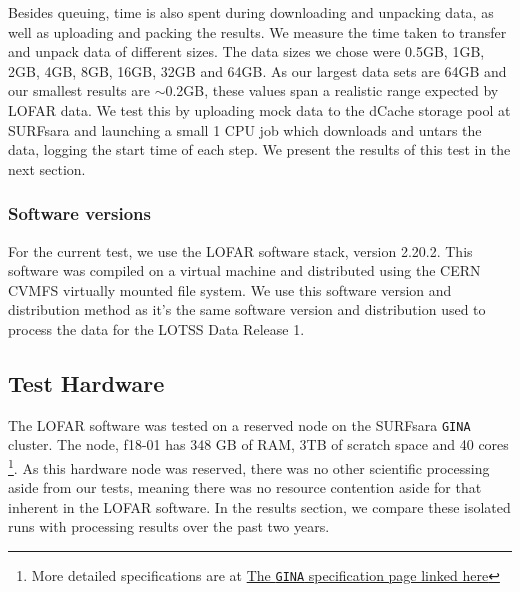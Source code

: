 Besides queuing, time is also spent during downloading and unpacking data, as well as uploading and packing the results. We measure the time taken to transfer and unpack data of different sizes. The data sizes we chose were 0.5GB, 1GB, 2GB, 4GB, 8GB, 16GB, 32GB and 64GB. As our largest data sets are 64GB and our smallest results are $\sim$0.2GB, these values span a realistic range expected by LOFAR data. We test this by uploading mock data to the dCache storage pool at SURFsara and launching a small 1 CPU job which downloads and untars the data, logging the start time of each step. We present the results of this test in the next section. 


\subsubsection{Software versions}\label{sec:software_versions}
For the current test, we use the LOFAR software stack, version 2.20.2. This software was compiled on a virtual machine and distributed using the CERN CVMFS virtually mounted file system. We use this software version and distribution method as it's the same software version and distribution used to process the data for the LOTSS Data Release 1. 

\subsection{Test Hardware}

The LOFAR software was tested on a reserved node on the SURFsara \texttt{GINA} cluster. The node, f18-01 has 348 GB of RAM, 3TB of scratch space and 40 cores \footnote{More detailed specifications are at \href{http://docs.surfsaralabs.nl/projects/grid/en/latest/Pages/Service/system_specifications/gina_specs.html}{The \texttt{GINA} specification page linked here}}. As this hardware node was reserved, there was no other scientific processing aside from our tests, meaning there was no resource contention aside for that inherent in the LOFAR software. In the results section, we compare these isolated runs with processing results over the past two years. 